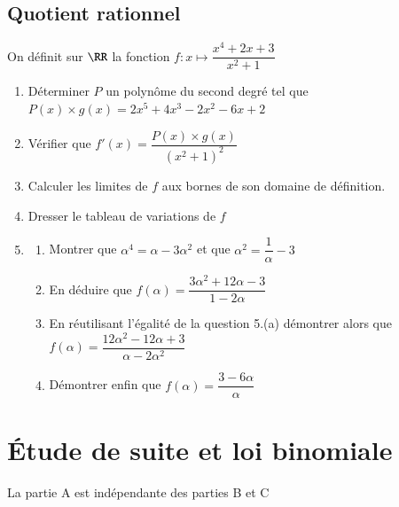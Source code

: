 \documentclass[oneside,12pt]{article}
\let\oldsection\section
\renewcommand{\section}{\newpage\oldsection}
\begin{document}
\subsection{Quotient rationnel}
On définit sur $\RR$ la fonction $f:x\mapsto \dfrac{x^4+2x+3}{x^2+1}$
\begin{enumerate}
    \item Déterminer $P$ un polynôme du second degré tel que $P(x)\times g(x)=2x^5+4x^3-2x^2-6x+2$
    \item Vérifier que $f'(x)=\dfrac{P(x)\times g(x)}{(x^2+1)^2}$
    \item Calculer les limites de $f$ aux bornes de son domaine de définition.
    \item Dresser le tableau de variations de $f$
    \item \begin{enumerate}
        \item Montrer que $\alpha^4=\alpha-3\alpha^2$ et que $\alpha^2=\dfrac{1}{\alpha}-3$
        \item En déduire que $f(\alpha)=\dfrac{3\alpha^2+12\alpha-3}{1-2\alpha}$
        \item En réutilisant l'égalité de la question 5.(a) démontrer alors que $f(\alpha)=\dfrac{12\alpha^2-12\alpha+3}{\alpha-2\alpha^2}$
        \item Démontrer enfin que $f(\alpha)=\dfrac{3-6\alpha}{\alpha}$
    \end{enumerate}
\end{enumerate}





\section{Étude de suite et loi binomiale}
La partie A est indépendante des parties B et C
\end{document}
